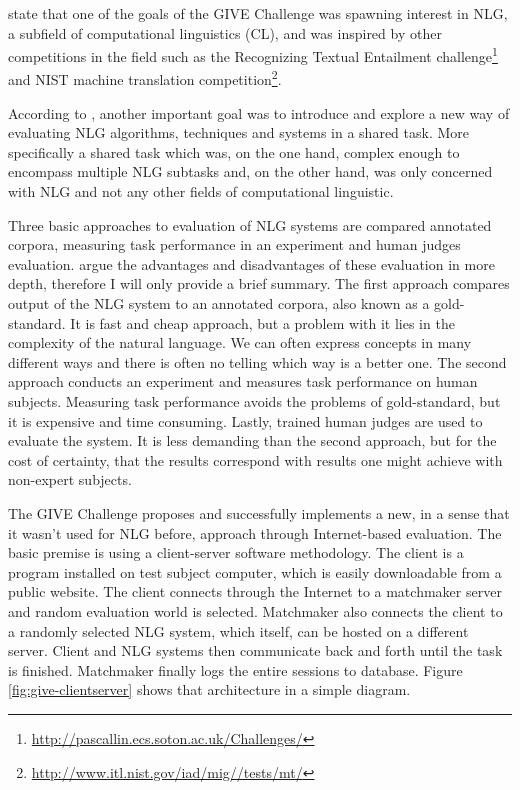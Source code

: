 \citet{koller2010first} state that one of the goals of the GIVE Challenge was spawning interest in NLG, a subfield of computational linguistics (CL), and was inspired by other competitions in the field such as the Recognizing Textual Entailment challenge\footnote{\url{http://pascallin.ecs.soton.ac.uk/Challenges/}} and NIST machine
translation competition\footnote{\url{http://www.itl.nist.gov/iad/mig//tests/mt/}}.

According to \citet{koller2010first}, another important goal was to introduce and explore a new way of evaluating NLG algorithms, techniques and systems in a shared task. More specifically a shared task which was, on the one hand, complex enough to encompass multiple NLG subtasks and, on the other hand, was only concerned with NLG and not any other fields of computational linguistic.

Three basic approaches to evaluation of NLG systems are compared annotated corpora, measuring task performance in an experiment and human judges evaluation. \citet{koller2010first} argue the advantages and disadvantages of these evaluation in more depth, therefore I will only provide a brief summary. The first approach compares output of the NLG system to an annotated corpora, also known as a gold-standard. It is fast and cheap approach, but a problem with it lies in the complexity of the natural language. We can often express concepts in many different ways and there is often no telling which way is a better one. The second approach conducts an experiment and measures task performance on human subjects. Measuring task performance avoids the problems of gold-standard, but it is expensive and time consuming. Lastly, trained human judges are used to evaluate the system. It is less demanding than the second approach, but for the cost of certainty, that the results correspond with results one might achieve with non-expert subjects.

The GIVE Challenge proposes and successfully implements a new, in a sense that it wasn't used for NLG before, approach through Internet-based evaluation. The basic premise is using a client-server software methodology. The client is a program installed on test subject computer, which is easily downloadable from a public website. The client connects through the Internet to a matchmaker server and random evaluation world is selected. Matchmaker also connects the client to a randomly selected NLG system, which itself, can be hosted on a different server. Client and NLG systems then communicate back and forth until the task is finished. Matchmaker finally logs the entire sessions to database. Figure \ref{fig:give-clientserver} shows that architecture in a simple diagram.

